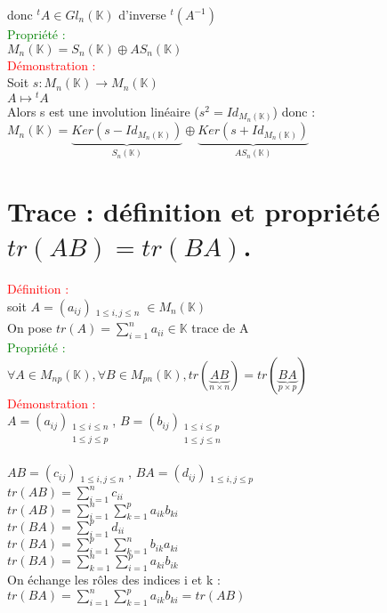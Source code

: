 \documentclass{article}
\begin{document}
donc ${}^t A \in Gl_n( \mathbb K)$ d'inverse ${}^t (A^{-1})$ \\
\textcolor{green}{Propriété :}  \\
$M_n(\mathbb K)= S_n(\mathbb K) \oplus AS_n(\mathbb K)$ \\
\textcolor{red}{Démonstration :} \\
Soit $s :M_n(\mathbb K) \rightarrow M_n (\mathbb K)$ \\
$A \mapsto {}^t A$ \\
Alors s est une involution linéaire ($s^2=Id_{M_n(\mathbb K)}$) donc : \\
$M_n (\mathbb K)= \underbrace{Ker(s-Id_{M_n(\mathbb K)})}_{S_n(\mathbb K)} \oplus \underbrace{Ker(s+ Id_{M_n(\mathbb K)})}_{AS_n(\mathbb K)}$
	\section{Trace : définition et propriété $tr(AB)=tr(BA)$.}
	\textcolor{red}{Définition :} \\
	soit $A=(a_{ij}){}_{\substack{1\leq i,j\leq n}}\in M_n(\mathbb K)$ \\
	On pose $tr(A)=\sum_{i=1}^n a_{ii} \in \mathbb K$ trace de A \\
	\textcolor{green}{Propriété :} \\
	$\forall A \in M_{np}(\mathbb K), \forall B \in M_{pn}(\mathbb K),tr(\underbrace{AB}_{n \times n})=tr(\underbrace{BA}_{p \times p})$ \\
	\textcolor{red}{Démonstration :} \\
	$A=(a_{ij}){}_{\substack{1\leq i\leq n \\ 1\leq j\leq p}}$,
	$B=(b_{ij}){}_{\substack{1\leq i\leq p \\ 1\leq j\leq n}}$ \\ \\
	$AB=(c_{ij}){}_{\substack{1\leq i,j\leq n}}$,
	$BA=(d_{ij}){}_{\substack{1\leq i,j\leq p}}$ \\
	$tr(AB)= \sum_{i=1}^n c_{ii}$ \\
	$tr(AB)= \sum_{i=1}^n \sum_{k=1}^p a_{ik}b_{ki}$ \\
	$tr(BA)= \sum_{i=1}^p d_{ii}$ \\
	$tr(BA)= \sum_{i=1}^p \sum_{k=1}^n b_{ik}a_{ki}$ \\
	$tr(BA)= \sum_{k=1}^n \sum_{i=1}^p a_{ki}b_{ik}$ \\
	On échange les rôles des indices i et k : \\
	$tr(BA)= \sum_{i=1}^n \sum_{k=1}^p a_{ik}b_{ki}=tr(AB)$
\end{document}
